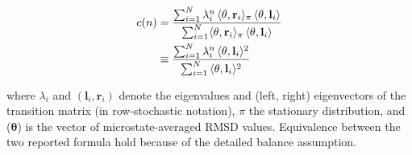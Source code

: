 \begin{align}
c(n)
&=
\frac{
\sum_{i=1}^{N}
\lambda_i^{n}\,
\langle \theta,\mathbf{r}_i\rangle_\pi\,
\langle \theta,\mathbf{l}_i\rangle
}
{
\sum_{i=1}^{N}
\langle \theta,\mathbf{r}_i\rangle_\pi\,
\langle \theta,\mathbf{l}_i\rangle
}
\notag \\
&\equiv
\frac{
\sum_{i=1}^{N}
\lambda_i^{n}\,
\langle \theta,\mathbf{l}_i\rangle^2
}
{\sum_{i=1}^{N}\, \langle \theta,\mathbf{l}_i\rangle^2} \notag
\end{align}

where $\lambda_i$ and $(\mathbf{l}_i, \mathbf{r}_i)$ denote the eigenvalues and (left, right) eigenvectors of the transition matrix (in row-stochastic notation), $\pi$ the stationary distribution,
and ($\boldsymbol{\theta}$) is the vector of microstate-averaged RMSD values. Equivalence between the two reported formula hold because of the detailed balance assumption.
%



